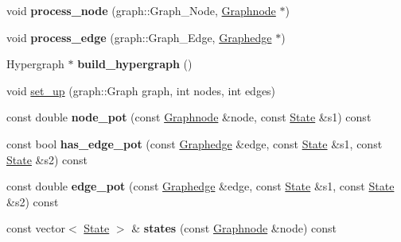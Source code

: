 \begin{DoxyCompactItemize}
\item 
\hypertarget{class_m_r_f_a3a2f7eb349a7345abfba2c5869f85b1f}{
void {\bfseries process\_\-node} (graph::Graph\_\-Node, \hyperlink{class_scarab_1_1_graph_1_1_graphnode}{Graphnode} $\ast$)}
\label{class_m_r_f_a3a2f7eb349a7345abfba2c5869f85b1f}

\item 
\hypertarget{class_m_r_f_aed7b8a7a2e3af7c14b501040630e9589}{
void {\bfseries process\_\-edge} (graph::Graph\_\-Edge, \hyperlink{class_scarab_1_1_graph_1_1_graphedge}{Graphedge} $\ast$)}
\label{class_m_r_f_aed7b8a7a2e3af7c14b501040630e9589}

\item 
\hypertarget{class_m_r_f_a34f0d586337501d668a62726eb0046d7}{
Hypergraph $\ast$ {\bfseries build\_\-hypergraph} ()}
\label{class_m_r_f_a34f0d586337501d668a62726eb0046d7}

\item 
void \hyperlink{class_m_r_f_a928f19f948fa97796462fd9542a985fd}{set\_\-up} (graph::Graph graph, int nodes, int edges)
\item 
\hypertarget{class_m_r_f_a3a7f11091d96ab8b2f830deb343fc3a6}{
const double {\bfseries node\_\-pot} (const \hyperlink{class_scarab_1_1_graph_1_1_graphnode}{Graphnode} \&node, const \hyperlink{struct_state}{State} \&s1) const }
\label{class_m_r_f_a3a7f11091d96ab8b2f830deb343fc3a6}

\item 
\hypertarget{class_m_r_f_ab73d5f7b51c206754bee9eea9405c0fb}{
const bool {\bfseries has\_\-edge\_\-pot} (const \hyperlink{class_scarab_1_1_graph_1_1_graphedge}{Graphedge} \&edge, const \hyperlink{struct_state}{State} \&s1, const \hyperlink{struct_state}{State} \&s2) const }
\label{class_m_r_f_ab73d5f7b51c206754bee9eea9405c0fb}

\item 
\hypertarget{class_m_r_f_a9f98956295352e9bfc9917328999c1b2}{
const double {\bfseries edge\_\-pot} (const \hyperlink{class_scarab_1_1_graph_1_1_graphedge}{Graphedge} \&edge, const \hyperlink{struct_state}{State} \&s1, const \hyperlink{struct_state}{State} \&s2) const }
\label{class_m_r_f_a9f98956295352e9bfc9917328999c1b2}

\item 
\hypertarget{class_m_r_f_a7c01a68384b81d1ba7d24508f767d216}{
const vector$<$ \hyperlink{struct_state}{State} $>$ \& {\bfseries states} (const \hyperlink{class_scarab_1_1_graph_1_1_graphnode}{Graphnode} \&node) const }
\label{class_m_r_f_a7c01a68384b81d1ba7d24508f767d216}


\end{DoxyCompactItemize}
